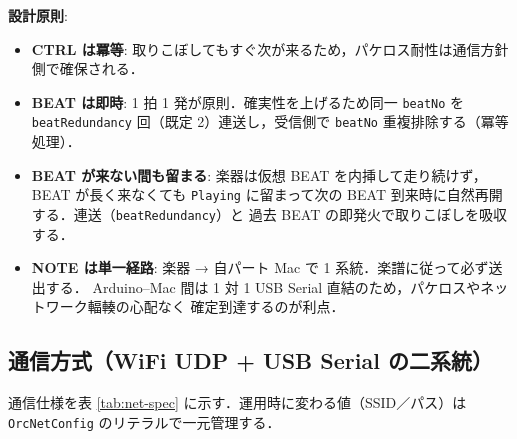 \documentclass[lualatex,book,paper=a4paper,jafontsize=11.5pt,jafontscale=1.05]{jlreq}
\begin{document}
\textbf{設計原則}:
\begin{itemize}
  \item \textbf{CTRL は冪等}: 取りこぼしてもすぐ次が来るため，パケロス耐性は通信方針側で確保される．
  \item \textbf{BEAT は即時}: 1 拍 1 発が原則．確実性を上げるため同一 \texttt{beatNo} を
        \texttt{beatRedundancy} 回（既定 2）連送し，受信側で \texttt{beatNo} 重複排除する（冪等処理）．
  \item \textbf{BEAT が来ない間も留まる}: 楽器は仮想 BEAT を内挿して走り続けず，BEAT が長く来なくても
        \texttt{Playing} に留まって次の BEAT 到来時に自然再開する．連送（\texttt{beatRedundancy}）と
        過去 BEAT の即発火で取りこぼしを吸収する．
  \item \textbf{NOTE は単一経路}: 楽器 → 自パート Mac で 1 系統．楽譜に従って必ず送出する．
        Arduino--Mac 間は 1 対 1 USB Serial 直結のため，パケロスやネットワーク輻輳の心配なく
        確定到達するのが利点．
\end{itemize}

\subsection{通信方式（WiFi UDP + USB Serial の二系統）}

通信仕様を表 \ref{tab:net-spec} に示す．運用時に変わる値（SSID／パス）は
\texttt{OrcNetConfig} のリテラルで一元管理する．
\end{document}
